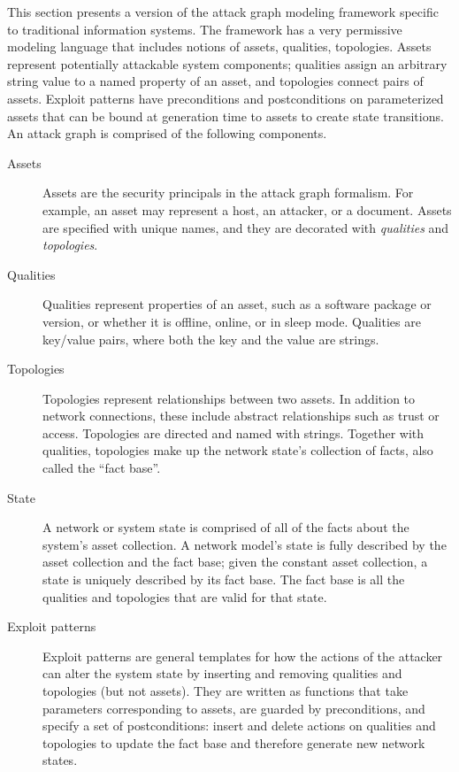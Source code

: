 This section presents a version of the attack graph modeling framework specific
to traditional information systems. The framework has a very permissive 
modeling language that
includes notions of assets, qualities, topologies. Assets represent potentially
attackable system components; qualities assign an arbitrary string value to a named
property of an asset, and topologies connect pairs of assets.
Exploit patterns have preconditions and postconditions on parameterized assets
that can be bound at generation time to assets to create state transitions.
An attack graph is comprised of the following components.
\begin{description}
	\item[Assets] Assets are the security principals in the attack graph 
        formalism. For example, an asset may represent a host, an attacker, or 
        a document. Assets are specified with unique names, and they are 
        decorated with \emph{qualities} and \emph{topologies}.
	\item[Qualities] Qualities represent properties of an asset, such as a software package or
		version, or whether it is offline, online, or in sleep mode. 
        Qualities are key/value pairs, where both the key and the value are 
        strings.
	\item[Topologies] Topologies represent relationships between two assets.
        In addition to network connections, these include abstract 
        relationships such as trust or access. Topologies are directed and
		named with strings. Together with qualities, topologies make up the
		network state's collection of facts, also called the ``fact base''.
	\item[State] A network or system state is comprised of all of the facts about the system's asset
		collection. A network model's state is fully described by the asset collection and the fact base;
		given the constant asset collection, a state is uniquely described by its fact base. The fact
		base is all the qualities and topologies that are valid for that state.
	\item[Exploit patterns] Exploit patterns are general templates for how the 
        actions of the attacker can alter the system state by inserting and 
        removing qualities and topologies (but not assets).
		They are written as functions that take parameters corresponding to assets,
        are guarded by preconditions, and specify a set of postconditions:
		insert and delete actions on qualities and topologies to update the 
        fact base and therefore generate new network states.
\end{description}
